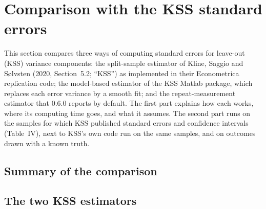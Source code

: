 \section{Comparison with the KSS standard errors}\label{sec:kss}

This section compares three ways of computing standard errors for leave-out (KSS) variance components: the
split-sample estimator of Kline, Saggio and S{\o}lvsten (2020, Section~5.2; ``KSS'') as implemented in their
Econometrica replication code; the model-based estimator of the KSS Matlab package, which replaces each error
variance by a smooth fit; and the repeat-measurement estimator that \fevc{} 0.6.0 reports by default. The first
part explains how each works, where its computing time goes, and what it assumes. The second part runs \fevc{} on
the samples for which KSS published standard errors and confidence intervals (Table~IV), next to KSS's own code
run on the same samples, and on outcomes drawn with a known truth.

\subsection{Summary of the comparison}\label{kss:sec:summary}


\subsection{The two KSS estimators}\label{kss:sec:methods}

